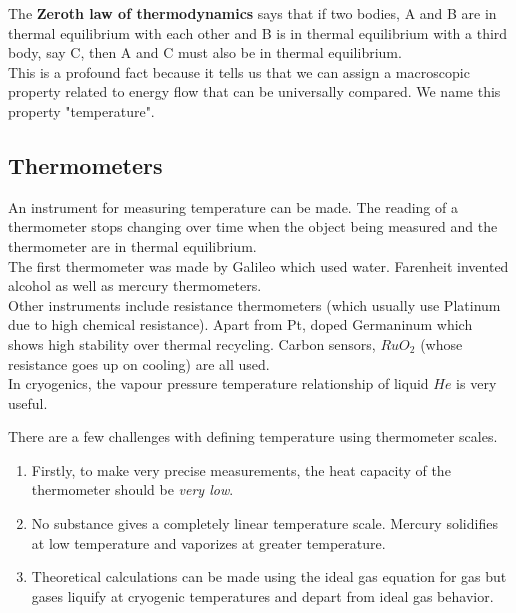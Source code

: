 \documentclass{article}
\begin{document}
	 The \textbf{Zeroth law of thermodynamics} says that if two bodies, A and B are in thermal equilibrium with each other and B is in thermal equilibrium with a third body, say C, then A and C must also be in thermal equilibrium.\\
	 This is a profound fact because it tells us that we can assign a macroscopic property related to energy flow that can be universally compared. We name this property "temperature".\\
	 
	 \subsection{Thermometers}
	 An instrument for measuring temperature can be made. The reading of a thermometer stops changing over time when the object being measured and the thermometer are in thermal equilibrium.\\
	 The first thermometer was made by Galileo which used water. Farenheit invented alcohol as well as mercury thermometers.\\
	 
	 Other instruments include resistance thermometers (which usually use Platinum due to high chemical resistance). Apart from Pt, doped Germaninum which shows high stability over thermal recycling.
	 Carbon sensors, $RuO_2$ (whose resistance goes up on cooling) are all used.\\
	 In cryogenics, the vapour pressure \textendash temperature relationship of liquid $He$ is very useful.
	 
	 There are a few challenges with defining temperature using thermometer scales.
	 
	 \begin{enumerate}
	 	\item Firstly, to make very precise measurements, the heat capacity of the thermometer should be \textit{very low}.
	 	
	 	\item No substance gives a completely linear temperature scale. Mercury solidifies at low temperature and vaporizes at greater temperature.
	 	
	 	\item Theoretical calculations can be made using the ideal gas equation for gas but gases liquify at cryogenic temperatures and depart from ideal gas behavior.
	 \end{enumerate}
	 
\end{document}
